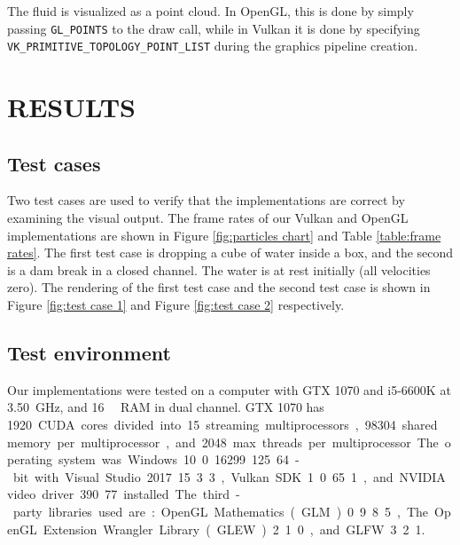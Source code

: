 \documentclass[a4paper, 12pt, oneside]{book}
\begin{document}
\begin{doublespace}
The fluid is visualized as a point cloud. In OpenGL, this is done by simply passing \texttt{GL_POINTS} to the draw call, while in Vulkan it is done by specifying \texttt{VK_PRIMITIVE_TOPOLOGY_POINT_LIST} during the graphics pipeline creation.
\end{doublespace}
\chapter{RESULTS}
\label{ch:results}

\section{Test cases}
\begin{doublespace}
    Two test cases are used to verify that the implementations are correct by examining the visual output. The frame rates of our Vulkan and OpenGL implementations are shown in Figure \ref{fig:particles chart} and Table \ref{table:frame rates}. The first test case is dropping a cube of water inside a box, and the second is a dam break in a closed channel. The water is at rest initially (all velocities zero). The rendering of the first test case and the second test case is shown in Figure \ref{fig:test case 1} and Figure \ref{fig:test case 2} respectively. 
\end{doublespace}

\section{Test environment}
\begin{doublespace}
    Our implementations were tested on a computer with GTX 1070 and i5-6600K at \SI{3.50}{\giga\hertz}, and \SI{16}{\giga\byte} RAM in dual channel. GTX 1070 has \SI{1920} CUDA cores divided into 15 streaming multiprocessors, \SI{98304}{\byte} shared memory per multiprocessor, and \SI{2048} max threads per multiprocessor. The operating system was Windows 10.0.16299.125 64-bit with Visual Studio 2017 15.3.3, Vulkan SDK 1.0.65.1, and NVIDIA video driver 390.77 installed. The third-party libraries used are: OpenGL Mathematics (GLM) 0.9.8.5, The OpenGL Extension Wrangler Library (GLEW) 2.1.0, and GLFW 3.2.1.  %
\end{doublespace}
\end{document}
